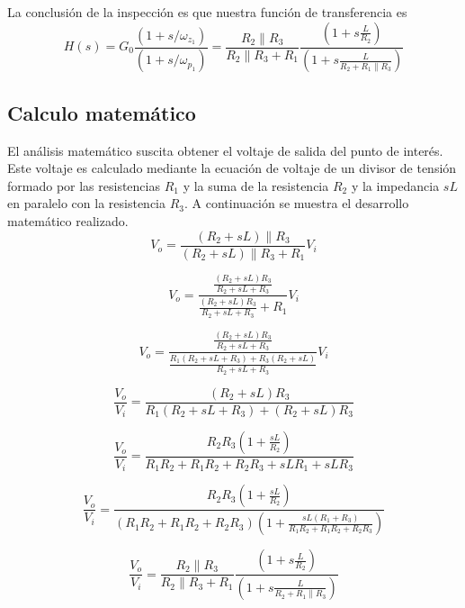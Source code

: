 \documentclass[letterpaper,11pt]{article}
\begin{document}
		La conclusión de la inspección es que nuestra función de transferencia es
		\[ H(s) =  G_0 \frac{\left(1 + s/\omega_{z_1}\right)}{\left(1 + s/\omega_{p_1}\right)} =  \frac{R_2 \parallel R_3}{R_2 \parallel R_3 + R_1} \frac{\left(1 + s\frac{L}{R_2}\right)}{\left(1 + s\frac {L}{R_2 + R_1 \parallel R_3}\right)} \]
	\subsection{Calculo matemático}
		El análisis matemático suscita obtener el voltaje de salida del punto de interés. Este voltaje es calculado mediante la ecuación de voltaje de un divisor de tensión formado por las resistencias $R_1$ y la suma de la resistencia $R_2$ y la impedancia $sL$ en paralelo con la resistencia $R_3$. A continuación se muestra el desarrollo matemático realizado.\\
		\[V_o = \frac{\left(R_2 +sL\right)\parallel R_3}{\left(R_2 +sL\right)\parallel R_3 + R_1} V_i\]
		
		\[ V_o = \frac{\frac{\left( R_2 + sL \right)R_3}{R_2+sL +R_3}}{\frac{\left( R_2 + sL \right)R_3}{R_2+sL +R_3} + R_1} V_i \]
		
		\[V_o = \frac{\frac{\left( R_2 + sL \right)R_3}{R_2+sL +R_3}}{\frac{R_1\left( R_2 + sL +R_3 \right) + R_3\left(R_2 +sL\right)}{R_2+sL +R_3}} V_i \]
		
		\[ \frac{V_o}{V_i} = \frac{\left( R_2 + sL \right) R_3}{R_1 \left( R_2 + sL + R_3 \right) + \left( R_2 + sL \right) R_3} \]
	
		\[ \frac{V_o}{V_i} =  \frac{R_2 R_3\left(1+\frac{sL}{R_2}\right)}{R_1 R_2 +R_1R_2 + R_2 R_3 +sLR_1+sLR_3} \]
		
		\[\frac{V_o}{V_i} =  \frac{R_2 R_3\left(1+\frac{sL}{R_2}\right)}{\left(R_1 R_2 +R_1R_2 + R_2 R_3 \right)\left( 1 + \frac{sL\left(R_1 + R_3\right)}{R_1 R_2 +R_1R_2 + R_2 R_3} \right)}  \]
		
		\[  \frac{V_o}{V_i} = \frac{R_2 \parallel R_3}{R_2 \parallel R_3 + R_1} \frac{\left(1 + s\frac{L}{R_2}\right)}{\left(1 + s\frac {L}{R_2 + R_1 \parallel R_3}\right)}\]
		
\end{document}

